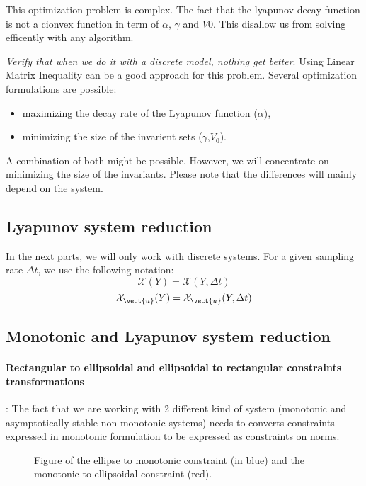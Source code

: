 This optimization problem is complex.
The fact that the lyapunov decay function is not a cionvex function in term of $\alpha$, $\gamma$ and $V0$. This disallow us from solving efficently with any algorithm.


\textit{Verify that when we do it with a discrete model, nothing get better}.
Using Linear Matrix Inequality can be a good approach for this problem.
Several optimization formulations are possible:
\begin{itemize}
\item maximizing the decay rate of the Lyapunov function ($\alpha$),
\item minimizing the size of the invarient sets ($\gamma$,$V_0$).
\end{itemize}
A combination of both might be possible.
However, we will concentrate on minimizing the size of the invariants.
Please note that the differences will mainly depend on the system.

\cite{Polyak200815349}
\cite{LMI_book}


\subsection{Lyapunov system reduction}
In the next parts, we will only work with discrete systems. For a given sampling rate $\Delta t$, we use the following notation:
$$\mathcal{X}(Y) = \mathcal{X}(Y,\Delta t)$$
$$\mathcal{X}_{\vect{u}}(Y) = \mathcal{X}_{\vect{u}}(Y,\Delta t)$$


\subsection{Monotonic and Lyapunov system reduction}
\paragraph{Rectangular to ellipsoidal and ellipsoidal to rectangular constraints transformations}:
The fact that we are working with 2 different kind of system (monotonic and asymptotically stable non monotonic systems) needs to converts constraints expressed in monotonic formulation to be expressed as constraints on norms.


\begin{figure}
	\center
	
	\caption{Figure of the ellipse to monotonic constraint (in blue) and the monotonic to ellipsoidal constraint (red).}
\end{figure}


